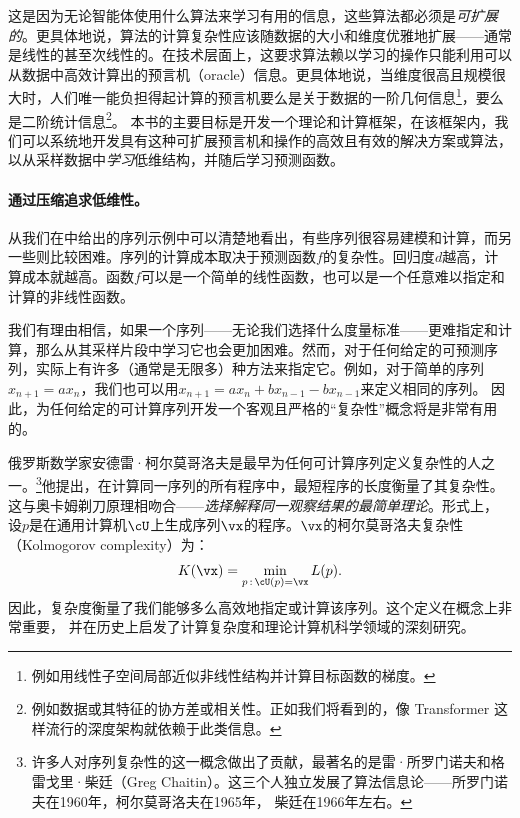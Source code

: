 \documentclass[../../book-main_zh.tex]{subfiles}
\begin{document}
这是因为无论智能体使用什么算法来学习有用的信息，这些算法都必须是\textit{可扩展的}。更具体地说，算法的计算复杂性应该随数据的大小和维度优雅地扩展——通常是线性的甚至次线性的。在技术层面上，这要求算法赖以学习的操作只能利用可以从数据中高效计算出的预言机（oracle）信息。更具体地说，当维度很高且规模很大时，人们唯一能负担得起计算的预言机要么是关于数据的一阶几何信息\footnote{例如用线性子空间局部近似非线性结构并计算目标函数的梯度。}，要么是二阶统计信息\footnote{例如数据或其特征的协方差或相关性。正如我们将看到的，像 Transformer 这样流行的深度架构就依赖于此类信息。}。
本书的主要目标是开发一个理论和计算框架，在该框架内，我们可以系统地开发具有这种可扩展预言机和操作的高效且有效的解决方案或算法，以从采样数据中\textit{学习}低维结构，并随后学习预测函数。

\paragraph{通过压缩追求低维性。}
从我们在中给出的序列示例中可以清楚地看出，有些序列很容易建模和计算，而另一些则比较困难。序列的计算成本取决于预测函数\(f\)的复杂性。回归度\(d\)越高，计算成本就越高。函数\(f\)可以是一个简单的线性函数，也可以是一个任意难以指定和计算的非线性函数。

我们有理由相信，如果一个序列——无论我们选择什么度量标准——更难指定和计算，那么从其采样片段中学习它也会更加困难。然而，对于任何给定的可预测序列，实际上有许多（通常是无限多）种方法来指定它。例如，对于简单的序列\(x_{n+1}
= a x_{n}\)，我们也可以用\(x_{n+1} = a x_{n} + b x_{n-1} - b x_{n-1}\)来定义相同的序列。
因此，为任何给定的可计算序列开发一个客观且严格的“复杂性”概念将是非常有用的。

俄罗斯数学家安德雷·柯尔莫哥洛夫是最早为任何可计算序列定义复杂性的人之一。\footnote{许多人对序列复杂性的这一概念做出了贡献，最著名的是雷·所罗门诺夫和格雷戈里·柴廷（Greg
Chaitin）。这三个人独立发展了算法信息论——所罗门诺夫在1960年，柯尔莫哥洛夫在1965年\cite{Kolmogorov1998OnTO}，
柴廷在1966年左右\cite{Chaitin-1966}。}他提出，在计算同一序列的所有程序中，最短程序的长度衡量了其复杂性。
这与奥卡姆剃刀原理相吻合——\textit{选择解释同一观察结果的最简单理论}。形式上，
设\(p\)是在通用计算机\(\cU\)上生成序列\(\vx\)的程序。\(\vx\)的柯尔莫哥洛夫复杂性（Kolmogorov
complexity）为：
\begin{equation}
        K(\vx) = \min_{p\,:\, \cU(p) = \vx} L(p).
\end{equation}
因此，复杂度衡量了我们能够多么高效地指定或计算该序列。这个定义在概念上非常重要，
并在历史上启发了计算复杂度和理论计算机科学领域的深刻研究。
\end{document}
